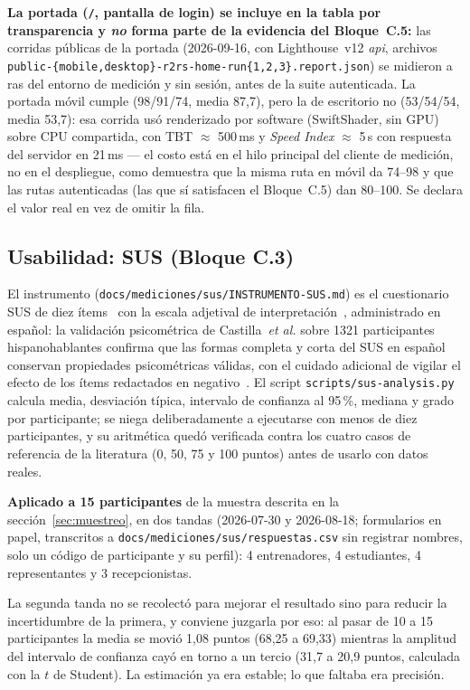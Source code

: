 \documentclass[11pt,a4paper]{article}
\newcommand{\ruta}[1]{\texttt{\footnotesize #1}}
\begin{document}
\textbf{La portada (\texttt{/}, pantalla de login) se incluye en la tabla
por transparencia y \emph{no} forma parte de la evidencia del
Bloque~C.5:} las corridas públicas de la portada (2026-09-16, con
Lighthouse~v12 \emph{api}, archivos
\texttt{public-\{mobile,desktop\}-r2rs-home-run\{1,2,3\}.report.json})
se midieron a ras del entorno de medición y sin sesión, antes de la
suite autenticada. La portada móvil cumple (98/91/74, media 87,7), pero
la de escritorio no (53/54/54, media 53,7): esa corrida usó renderizado
por software (SwiftShader, sin GPU) sobre CPU compartida, con TBT
$\approx$ 500\,ms y \emph{Speed Index} $\approx$ 5\,s con respuesta del
servidor en 21\,ms — el costo está en el hilo principal del cliente de
medición, no en el despliegue, como demuestra que la misma ruta en móvil
da 74--98 y que las rutas autenticadas (las que sí satisfacen el
Bloque~C.5) dan 80--100. Se declara el valor real en vez de omitir la
fila.

\subsection{Usabilidad: SUS (Bloque C.3)}
\label{sec:sus}

El instrumento (\ruta{docs/mediciones/sus/INSTRUMENTO-SUS.md}) es el
cuestionario SUS de diez ítems~\cite{brooke1996} con la escala adjetival de
interpretación~\cite{bangor2009}, administrado en español: la validación
psicométrica de Castilla~\emph{et al.} sobre 1321 participantes hispanohablantes
confirma que las formas completa y corta del SUS en español conservan
propiedades psicométricas válidas, con el cuidado adicional de vigilar el
efecto de los ítems redactados en negativo~\cite{castilla2023sus}. El script
\ruta{scripts/sus-analysis.py}
calcula media, desviación típica, intervalo de confianza al 95\,\%, mediana
y grado por participante; se niega deliberadamente a ejecutarse con menos
de diez participantes, y su aritmética quedó verificada contra los cuatro
casos de referencia de la literatura (0, 50, 75 y 100 puntos) antes de
usarlo con datos reales.

\textbf{Aplicado a 15 participantes} de la muestra descrita en la
sección~\ref{sec:muestreo}, en dos tandas (2026-07-30 y
2026-08-18; formularios en papel, transcritos a
\ruta{docs/mediciones/sus/respuestas.csv} sin registrar nombres, solo
un código de participante y su perfil): 4 entrenadores, 4 estudiantes,
4 representantes y 3 recepcionistas.

La segunda tanda no se recolectó para mejorar el resultado sino para
reducir la incertidumbre de la primera, y conviene juzgarla por eso: al
pasar de 10 a 15 participantes la media se movió 1,08 puntos (68,25 a
69,33) mientras la amplitud del intervalo de confianza cayó en torno a
un tercio (31,7 a 20,9 puntos, calculada con la $t$ de Student). La
estimación ya era estable; lo que faltaba era precisión.
\end{document}
